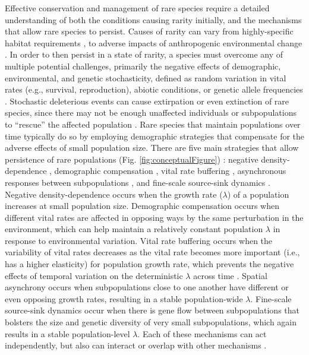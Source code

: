 \documentclass[12pt, letterpaper]{article}
\begin{document}
Effective conservation and management of rare species require a detailed understanding of both the conditions causing rarity initially, and the mechanisms that allow rare species to persist. Causes of rarity can vary from highly-specific habitat requirements \cite{Sgarbi2018YouTime}, to adverse impacts of anthropogenic environmental change \cite{Vincent2020-tz}. In order to then persist in a state of rarity, a species must overcome any of multiple potential challenges, primarily the negative effects of demographic, environmental, and genetic stochasticity, defined as random variation in vital rates (e.g., survival, reproduction), abiotic conditions, or genetic allele frequencies \cite{May1973StabilityEnvironments}. Stochastic deleterious events can cause extirpation or even extinction of rare species, since there may not be enough unaffected individuals or subpopulations to “rescue” the affected population \cite{Nei1975ThePopulations}. Rare species that maintain populations over time typically do so by employing demographic strategies that compensate for the adverse effects of small population size. There are five main strategies that allow persistence of rare populations (Fig. \ref{fig:conceptualFigure}) \cite{Dibner2019}: negative density-dependence \cite{Rovere2019PersistentlyAvoid}, demographic compensation \cite{Villellas2015DemographicImplications}, vital rate buffering \cite{Pfister1998PatternsImplications, Hilde2020TheChallenges}, asynchronous responses between subpopulations \cite{Abbott2017PortfolioWeberi}, and fine-scale source-sink dynamics \cite{Kauffman2004SpatialPopulation, Pulliam2016SourcesUse}. Negative density-dependence occurs when the growth rate ($\lambda$)  of a population increases at small population size. Demographic compensation occurs when different vital rates are affected in opposing ways by the same perturbation in the environment, which can help maintain a relatively constant population $\lambda$ in response to environmental variation. Vital rate buffering occurs when the variability of vital rates decreases as the vital rate becomes more important (i.e., has a higher elasticity) for population growth rate, which prevents the negative effects of temporal variation on the deterministic $\lambda$ across time \cite{Tuljapurkar1989An.}. Spatial asynchrony occurs when subpopulations close to one another have different or even opposing growth rates, resulting in a stable population-wide $\lambda$. Fine-scale source-sink dynamics occur when there is gene flow between subpopulations that bolsters the size and genetic diversity of very small subpopulations, which again results in a stable population-level $\lambda$. Each of these mechanisms can act independently, but also can interact or overlap with other mechanisms \cite{Dibner2019}.  
\end{document}
